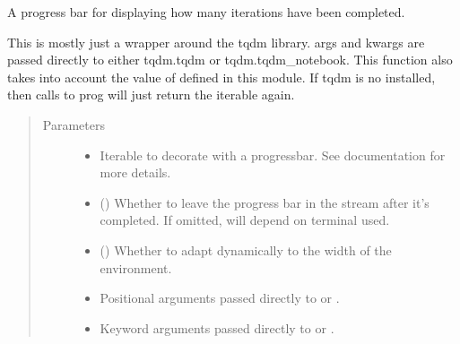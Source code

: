 \documentclass[letterpaper,10pt,english]{sphinxmanual}
\begin{document}
\begin{fulllineitems}
\label{\detokenize{xanespy:xanespy.utilities.prog}}
A progress bar for displaying how many iterations have been
completed.

This is mostly just a wrapper around the tqdm library. args and
kwargs are passed directly to either tqdm.tqdm or
tqdm.tqdm\_notebook. This function also takes into account the
value of  defined in this module. If tqdm is no
installed, then calls to prog will just return the iterable again.
\begin{quote}\begin{description}
\item[{Parameters}] \leavevmode\begin{itemize}
\item {} 
 \textendash{} Iterable to decorate with a progressbar. See 
documentation for more details.

\item {} 
 (\sphinxstyleliteralemphasis{, }) \textendash{} Whether to leave the progress bar in the stream after it’s
completed. If omitted, will depend on terminal used.

\item {} 
 (\sphinxstyleliteralemphasis{, }) \textendash{} Whether to adapt dynamically to the width of the environment.

\item {} 
 \textendash{} Positional arguments passed directly to  or .

\item {} 
 \textendash{} Keyword arguments passed directly to  or .

\end{itemize}

\end{description}\end{quote}

\end{fulllineitems}
\end{document}

